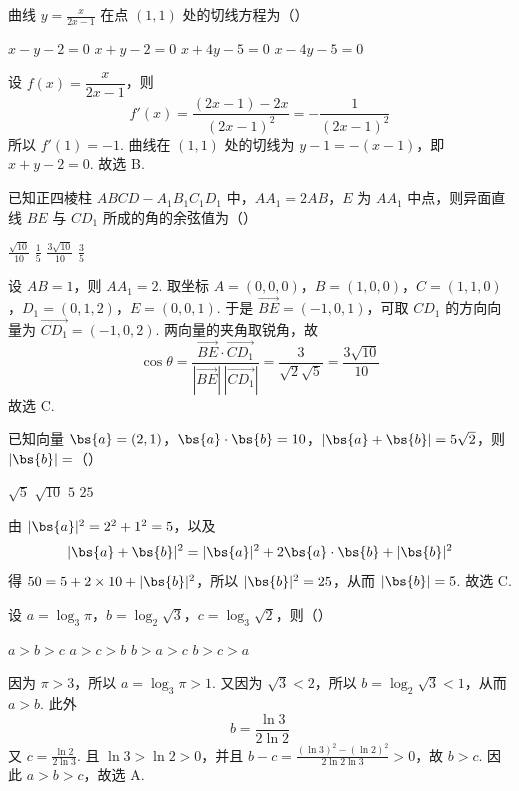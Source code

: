 \begin{problem}
曲线 \( y = \frac{x}{2x - 1} \) 在点 \((1,1)\) 处的切线方程为（\quad）

\choices
    {\(x - y - 2 = 0\)}
    {\(x + y - 2 = 0\)}
    {\(x + 4y - 5 = 0\)}
    {\(x - 4y - 5 = 0\)}

\begin{solution}
设 \(f(x)=\dfrac{x}{2x-1}\)，则
\[
f'(x)=\frac{(2x-1)-2x}{(2x-1)^2}=-\frac{1}{(2x-1)^2}
\]
所以 \(f'(1)=-1\).
曲线在 \((1,1)\) 处的切线为 \(y-1=-(x-1)\)，即 \(x+y-2=0\). 故选 B.
\end{solution}
\end{problem}

\begin{problem}
已知正四棱柱 \(ABCD - A_{1}B_{1}C_{1}D_{1}\) 中，\(AA_{1} = 2AB\)，\(E\) 为 \(AA_{1}\) 中点，则异面直线 \(BE\) 与 \(CD_{1}\) 所成的角的余弦值为（\quad）

\choices
    {\(\frac{\sqrt{10}}{10}\)}
    {\(\frac{1}{5}\)}
    {\(\frac{3\sqrt{10}}{10}\)}
    {\(\frac{3}{5}\)}

\begin{solution}
设 \(AB=1\)，则 \(AA_{1}=2\). 取坐标 \(A=(0,0,0)\)，\(B=(1,0,0)\)，\(C=(1,1,0)\)，\(D_{1}=(0,1,2)\)，\(E=(0,0,1)\).
于是 \(\overrightarrow{BE}=(-1,0,1)\)，可取 \(CD_{1}\) 的方向向量为 \(\overrightarrow{CD_{1}}=(-1,0,2)\). 两向量的夹角取锐角，故
\[
\cos\theta=\frac{\overrightarrow{BE}\cdot\overrightarrow{CD_{1}}}{|\overrightarrow{BE}|\,|\overrightarrow{CD_{1}}|}
=\frac{3}{\sqrt{2}\sqrt{5}}=\frac{3\sqrt{10}}{10}
\]
故选 C.
\end{solution}
\end{problem}

\begin{problem}
已知向量 \(\bs{a} = (2, 1)\)，\(\bs{a} \cdot \bs{b} = 10\)，\(|\bs{a} + \bs{b}| = 5\sqrt{2}\)，则 \(|\bs{b}| =\)（\quad）

\choices
    {\(\sqrt{5}\)}
    {\(\sqrt{10}\)}
    {\(5\)}
    {\(25\)}

\begin{solution}
由 \(|\bs{a}|^{2}=2^{2}+1^{2}=5\)，以及
\[
|\bs{a}+\bs{b}|^{2}=|\bs{a}|^{2}+2\bs{a}\cdot\bs{b}+|\bs{b}|^{2}
\]
得 \(50=5+2\times10+|\bs{b}|^{2}\)，所以 \(|\bs{b}|^{2}=25\)，从而 \(|\bs{b}|=5\). 故选 C.
\end{solution}
\end{problem}

\begin{problem}
设 \(a = \log_3 \pi\)，\(b = \log_2 \sqrt{3}\)，\(c = \log_3 \sqrt{2}\)，则（\quad）

\choices
    {\(a > b > c\)}
    {\(a > c > b\)}
    {\(b > a > c\)}
    {\(b > c > a\)}

\begin{solution}
因为 \(\pi>3\)，所以 \(a=\log_{3}\pi>1\). 又因为 \(\sqrt{3}<2\)，所以 \(b=\log_{2}\sqrt{3}<1\)，从而 \(a>b\). 此外
\[
b=\frac{\ln3}{2\ln2}
\]
又 \(c=\frac{\ln2}{2\ln3}\). 且 \(\ln3>\ln2>0\)，并且 \(b-c=\frac{(\ln3)^2-(\ln2)^2}{2\ln2\ln3}>0\)，故 \(b>c\). 因此 \(a>b>c\)，故选 A.
\end{solution}
\end{problem}

